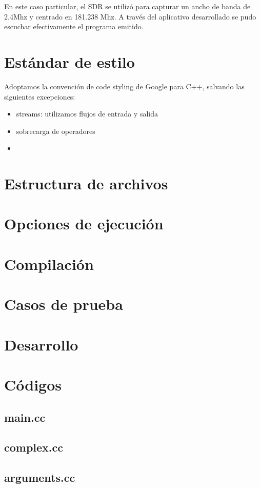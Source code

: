 \documentclass[10pt,a4paper]{article}
\begin{document}
En este caso particular, el SDR se utilizó para capturar un ancho
de banda de 2.4Mhz y centrado en 181.238 Mhz. A través del aplicativo
desarrollado se pudo escuchar efectivamente el programa emitido.


\section{Estándar de estilo}
Adoptamos la convención de code styling de Google para C++, salvando las siguientes excepciones:\\
\begin{itemize}
\item streams: utilizamos flujos de entrada y salida
\item sobrecarga de operadores
\item 

\end{itemize}
\section{Estructura de archivos}
\section{Opciones de ejecución}
\section{Compilación}
\section{Casos de prueba}

\section{Desarrollo}
\section{Códigos}
\subsection*{main.cc}


\subsection*{complex.cc}

\subsection*{arguments.cc}

\end{document}
